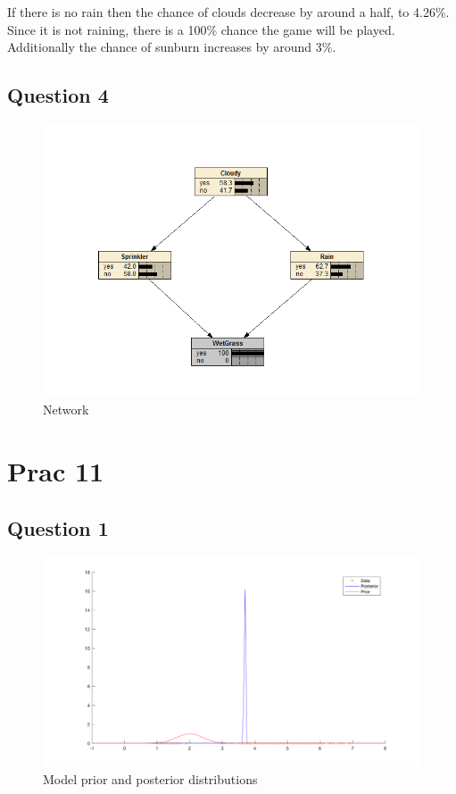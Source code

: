If there is no rain then the chance of clouds decrease by around a half, to 4.26\%.
Since it is not raining, there is a 100\% chance the game will be played.
Additionally the chance of sunburn increases by around 3\%.

\subsection*{Question 4}



\begin{figure}[H]
    \includegraphics[width=\linewidth]{../../pracs/prac10/q4}
    \centering
    \caption{Network}
\end{figure}

\section*{Prac 11}

\subsection{Question 1}



\begin{figure}[H]
    \includegraphics[width=\linewidth]{../../pracs/prac11/q1_graph}
    \centering
    \caption{Model prior and posterior distributions}
\end{figure}


